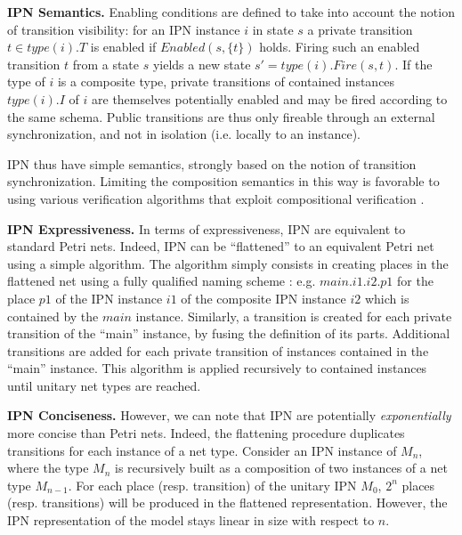 \textbf{IPN Semantics.}
Enabling conditions are defined to take into account the notion of
transition visibility: for an IPN instance $i$ in state $s$ a private
transition $t \in \mathit{type}(i).T$ is enabled if $Enabled(s,\{t\})$ holds. Firing such an enabled transition $t$ from a state $s$ yields a new
state $s'=\mathit{type(i).Fire}(s,t)$.  If the type of
$i$ is a composite type, private transitions of contained instances
$\mathit{type}(i).I$ of $i$ are themselves potentially enabled and may be fired according to the
same schema.  Public transitions are thus only fireable through an external
synchronization, and not in isolation (i.e. locally to an instance).

IPN thus have simple semantics, strongly based on the notion of transition
synchronization.  Limiting the composition semantics in this way is
favorable to using various verification algorithms that exploit
compositional verification \cite{}.

\textbf{IPN Expressiveness.} In terms of expressiveness, IPN are
equivalent to standard Petri nets. Indeed, IPN can be ``flattened''
to an equivalent Petri net using a simple algorithm.  The algorithm
simply consists in creating places in the flattened net using a
fully qualified naming scheme : e.g. $\mathit{main}.i1.i2.p1$ for
the place $p1$ of the IPN instance $i1$ of the composite IPN
instance $i2$ which is contained by the $\mathit{main}$ instance.
Similarly, a transition is created for each private transition of
the ``main'' instance, by fusing the definition of its parts.
Additional transitions are added for each private transition of
instances contained in the ``main'' instance. This algorithm is
applied recursively to contained instances until unitary net types
are reached.

\textbf{IPN Conciseness.} However, we can note that IPN are potentially
\emph{exponentially} more concise than Petri nets. Indeed, the flattening
procedure duplicates transitions for each instance of a net type.  Consider
an IPN instance of $M_n$, where the type $M_n$ is recursively
built as a composition of two instances of a net type $M_{n-1}$. For
each place (resp. transition) of the unitary IPN $M_0$, $2^n$ places
(resp. transitions) will be produced in the flattened
representation. However, the IPN representation of the model stays
linear in size with respect to $n$.
